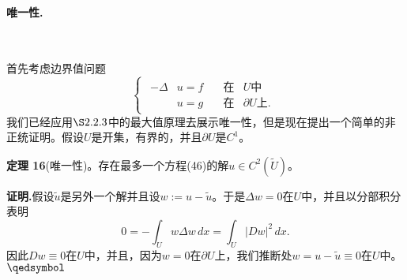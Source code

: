 \documentclass[leqno]{article}
\numberwithin{equation}{subsection}%
\begin{document}
\paragraph{唯一性.}~{}
\par
首先考虑边界值问题
\begin{equation}
\begin{cases}
\begin{aligned}
-\Delta &u=f\quad&\text{在}& U\text{中}\\
&u=g&\text{在}&\partial U\text{上}.
\end{aligned}
\end{cases}
\end{equation}
我们已经应用$\S 2.2.3$中的最大值原理去展示唯一性，但是现在提出一个简单的非正统证明。假设$U$是开集，有界的，并且$\partial U$是$C^{1}$。
\par
\noindent\textbf{定理 16}(唯一性)。存在最多一个方程(46)的解$u\in C^{2}(\tilde{U})$。
\par
\noindent\textbf{证明.}假设$\tilde{u}$是另外一个解并且设$w:=u-\tilde{u}$。于是$\Delta w=0$在$U$中，并且以分部积分表明
\begin{equation*}
0=-\int_{U}w\Delta w\,dx=\int_{U}|Dw|^{2}\,dx.
\end{equation*}
因此$Dw\equiv 0$在$U$中，并且，因为$w=0$在$\partial U$上，我们推断处$w=u-\tilde{u}\equiv 0$在$U$中。$\hfill\qedsymbol$
\end{document}
